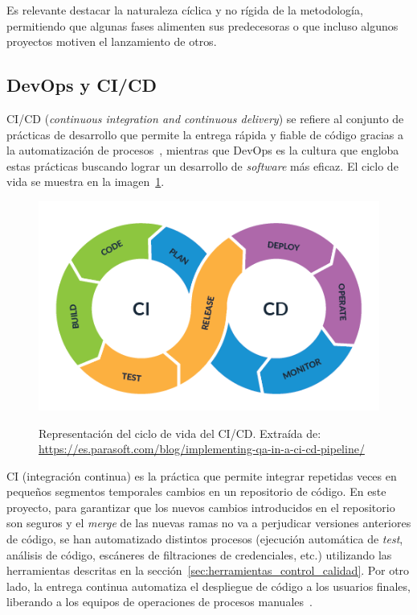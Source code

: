 Es relevante destacar la naturaleza cíclica y no rígida de la metodología, permitiendo que algunas fases alimenten sus predecesoras o que incluso algunos proyectos motiven el lanzamiento de otros.

\subsection{DevOps y CI/CD}

CI/CD (\textit{continuous integration and continuous delivery}) se refiere al conjunto de prácticas de desarrollo que permite la entrega rápida y fiable de código gracias a la automatización de procesos~\cite{cdciUnity}, mientras que DevOps es la cultura que engloba estas prácticas buscando lograr un desarrollo de \textit{software} más eficaz. El ciclo de vida se muestra en la imagen~\ref{img:4_cicd}.

\begin{figure}[h]
	\caption[Técnicas: Ciclo de vida del CI/CD]{Representación del ciclo de vida del CI/CD. Extraída de: \url{https://es.parasoft.com/blog/implementing-qa-in-a-ci-cd-pipeline/}}
	\centering
	\includegraphics[scale=0.6]{../img/memoria/4_cicd.png}
	\label{img:4_cicd}
\end{figure}


CI (integración continua) es la práctica que permite integrar repetidas veces en pequeños segmentos temporales cambios en un repositorio de código. En este proyecto, para garantizar que los nuevos cambios introducidos en el repositorio son seguros y el \textit{merge} de las nuevas ramas no va a perjudicar versiones anteriores de código, se han automatizado distintos procesos (ejecución automática de \textit{test}, análisis de código, escáneres de filtraciones de credenciales, etc.) utilizando las herramientas descritas en la sección~\ref{sec:herramientas_control_calidad}. Por otro lado, la entrega continua automatiza el despliegue de código a los usuarios finales, liberando a los equipos de operaciones de procesos manuales~\cite{cdciRedHat}. 

